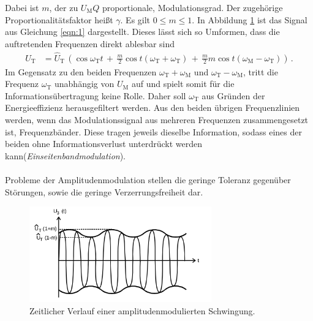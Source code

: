 Dabei ist $m$, der zu $U_{\text{M}}Q$ proportionale, Modulationsgrad.
Der zugehörige Proportionalitätsfaktor heißt $\gamma$.
Es gilt $0 \leq m \leq 1$.
In Abbildung \ref{fig:amplitudenmodulation_1} ist das Signal aus Gleichung
\eqref{eqn:1} dargestellt.
Dieses lässt sich so Umformen, dass die auftretenden Frequenzen direkt
ablesbar sind
\begin{align}
\label{eqn:2}
U_{\text{T}} &= \hat{U}_{\text{T}} \, \left( \cos \omega_{\text{T}} t \, + \, \frac{m}{2} \cos t\left( \omega_{\text{T}} + \omega_{\text{T}} \right) \, + \, \frac{m}{2} m \cos t \left( \omega_{\text{M}} - \omega_{\text{T}} \right)\right) \, .
\end{align}
Im Gegensatz zu den beiden Frequenzen $\omega_{\text{T}} + \omega_{\text{M}}$ und $\omega_{\text{T}} - \omega_{\text{M}}$, tritt die Frequenz $\omega_{\text{T}}$
unabhängig von $U_{\text{M}}$ auf und spielt somit
für die Informationsübertragung keine Rolle. Daher soll $\omega_{\text{T}}$
aus Gründen der Energieeffizienz herausgefiltert werden.
Aus den beiden übrigen Frequenzlinien werden, wenn das Modulationssignal
aus mehreren Frequenzen zusammengesetzt ist, Frequenzbänder.
Diese tragen jeweils dieselbe Information, sodass eines der beiden ohne
Informationsverlust unterdrückt werden kann(\textit{Einseitenbandmodulation}).\\ \\

Probleme der Amplitudenmodulation stellen die geringe Toleranz gegenüber
Störungen, sowie die geringe Verzerrungsfreiheit dar.

\begin{figure}
\centering
\includegraphics[width=0.7\textwidth]{figures/amplitudenmodulation.PNG}
\caption{Zeitlicher Verlauf einer amplitudenmodulierten Schwingung.\cite{sample}}
\label{fig:amplitudenmodulation_1}
\end{figure}

